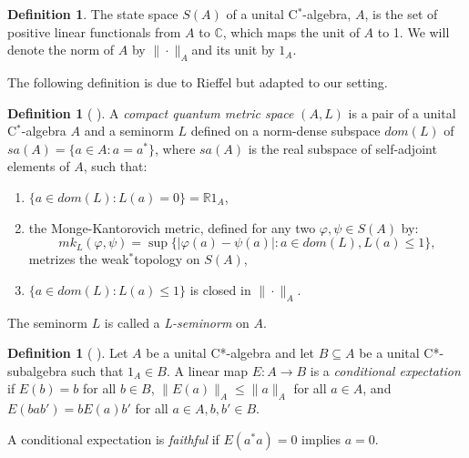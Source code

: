\documentclass[]{amsart}
\newcommand{\vhi}{{\varphi}}
\newcommand{\R}{{\mathds{R}}}
\newcommand{\C}{{\mathds{C}}}
\theoremstyle{plain}
\theoremstyle{definition}
\newtheorem{definition}[theorem]{Definition}
\theoremstyle{remark}
\renewcommand{\leq}{\leqslant}
\numberwithin{equation}{section}
\begin{document}
  
\begin{definition}\label{d:Statespace}
The state space $S(A)$ of a unital C$^*$-algebra, $A$, is the set of positive linear functionals from $A$ to $\C$, which maps the unit of $A$ to 1. We will denote the norm of $A$ by $\|\cdot\|_A$and its unit by $1_A$.
\end{definition}


 
The following definition is due to  Rieffel \cite{Rieffel98a} but adapted to our setting.
\begin{definition}[\! {\cite{Rieffel98a}}]\label{d:Comquametspa}
A \textit{compact quantum metric space} $(A, L)$ is a pair of a unital C$^*$-algebra  $A$ and a seminorm $L$ defined on a norm-dense subspace $dom(L)$ of $sa(A)=\{a \in A : a=a^*\}$, where $sa(A)$ is the real subspace of self-adjoint elements of $A$, such that:
\begin{enumerate}
    \item $\{a\in dom(L) : L(a)=0\} = \R1_A $,
    \item the Monge-Kantorovich metric, defined for any two  $\vhi, \psi \in S(A)$ by:
    $$mk_L(\vhi,\psi) = \sup\{|\vhi(a)-\psi(a)| : a\in dom(L) , L(a) \leq 1\},$$
    metrizes the weak$^*$topology on $ S(A)$,
    \item $\{a \in dom(L) : L(a)\leq 1 \}$  is closed in  $\|\cdot \|_A.$
\end{enumerate}
The seminorm $L$ is called a {\em L-seminorm} on $A$.\\
\end{definition}


\begin{definition}[\! {\cite[Definition 1.5.9 and Theorem 1.5.10(Tomiyama)]{Brown-Ozawa}}]\label{d:cond-exp}
Let $A$ be a unital C*-algebra and let $B\subseteq A$ be a unital C*-subalgebra such that $1_A\in B$. A linear map $E : A \rightarrow B$ is a {\em conditional expectation} if $E(b)=b$ for all $b \in B$, $\|E(a)\|_A\leq \|a\|_A$ for all $a \in A$, and $E(bab')=bE(a)b'$ for all $a\in A, b,b'\in B$.

A conditional expectation is {\em faithful} if $E(a^*a)=0$ implies $a=0$.
\end{definition}
\end{document}
